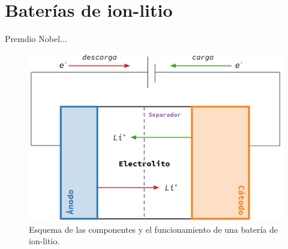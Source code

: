 \section{Baterías de ion-litio}

Premdio Nobel...

\begin{figure}[h!]
    \centering
    \includegraphics[width=.8\textwidth]{Introduccion/baterias/esquema_bateria.png}
    \caption{Esquema de las componentes y el funcionamiento de una batería de 
    ion-litio.}
    \label{fig:esquema-bateria}
\end{figure}

